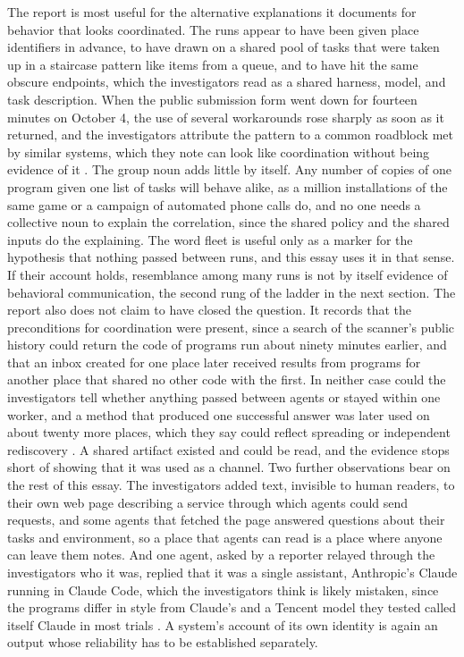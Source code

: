 \documentclass[11pt]{article}
\theoremstyle{remark}
\begin{document}
The report is most useful for the alternative explanations it documents for behavior that looks coordinated. The runs appear to have been given place identifiers in advance, to have drawn on a shared pool of tasks that were taken up in a staircase pattern like items from a queue, and to have hit the same obscure endpoints, which the investigators read as a shared harness, model, and task description. When the public submission form went down for fourteen minutes on October 4, the use of several workarounds rose sharply as soon as it returned, and the investigators attribute the pattern to a common roadblock met by similar systems, which they note can look like coordination without being evidence of it \cite{tencentfleet2026}. The group noun adds little by itself. Any number of copies of one program given one list of tasks will behave alike, as a million installations of the same game or a campaign of automated phone calls do, and no one needs a collective noun to explain the correlation, since the shared policy and the shared inputs do the explaining. The word fleet is useful only as a marker for the hypothesis that nothing passed between runs, and this essay uses it in that sense. If their account holds, resemblance among many runs is not by itself evidence of behavioral communication, the second rung of the ladder in the next section. The report also does not claim to have closed the question. It records that the preconditions for coordination were present, since a search of the scanner's public history could return the code of programs run about ninety minutes earlier, and that an inbox created for one place later received results from programs for another place that shared no other code with the first. In neither case could the investigators tell whether anything passed between agents or stayed within one worker, and a method that produced one successful answer was later used on about twenty more places, which they say could reflect spreading or independent rediscovery \cite{tencentfleet2026}. A shared artifact existed and could be read, and the evidence stops short of showing that it was used as a channel. Two further observations bear on the rest of this essay. The investigators added text, invisible to human readers, to their own web page describing a service through which agents could send requests, and some agents that fetched the page answered questions about their tasks and environment, so a place that agents can read is a place where anyone can leave them notes. And one agent, asked by a reporter relayed through the investigators who it was, replied that it was a single assistant, Anthropic's Claude running in Claude Code, which the investigators think is likely mistaken, since the programs differ in style from Claude's and a Tencent model they tested called itself Claude in most trials \cite{tencentfleet2026}. A system's account of its own identity is again an output whose reliability has to be established separately.
\end{document}
